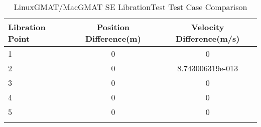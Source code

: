 \begin{table}[htbp!]
\centering
\caption{ LinuxGMAT/MacGMAT SE LibrationTest Test Case Comparison}
      \begin{tabular}{lcc}
      \hline\hline
          Libration Point & Position Difference(m) & Velocity Difference(m/s) \\
         \hline
         1 & 0 & 0 \\
         2 & 0 & 8.743006319e-013 \\
         3 & 0 & 0 \\
         4 & 0 & 0 \\
         5 & 0 & 0 \\
      \hline\hline
      \label{Table: LinuxGMAT-MacGMAT SE LibrationTest Table} 
\end{tabular}
\end{table}
